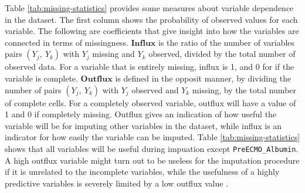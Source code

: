 \documentclass[12pt,]{article}
\begin{document}
Table \ref{tab:missing-statistics} provides some measures about variable
dependence in the dataset. The first column shows the probability of
observed values for each variable. The following are coefficients that
give insight into how the variables are connected in terms of
missingness. \(\mathbf{Influx}\) is the ratio of the number of variables
pairs \((Y_j, ~Y_k)\) with \(Y_j\) missing and \(Y_k\) observed, divided
by the total number of observed data. For a variable that is entirely
missing, influx is 1, and 0 for if the variable is complete.
\(\mathbf{Outflux}\) is defined in the opposit manner, by dividing the
number of pairs \((Y_j, ~Y_k)\) with \(Y_j\) observed and \(Y_k\)
missing, by the total number of complete cells. For a completely
observed variable, outflux will have a value of 1 and 0 if completely
missing. Outflux gives an indication of how useful the variable will be
for imputing other variables in the dataset, while influx is an
indicator for how easily the variable can be imputed. Table
\ref{tab:missing-statistics} shows that all variables will be useful
during impuation except \texttt{PreECMO\_Albumin}. A high outflux
variable might turn out to be useless for the imputation procedure if it
is unrelated to the incomplete variables, while the usefulness of a
highly predictive variables is severely limited by a low outflux value
\citeyearpar{van_buuren_flexible_2012}.
\end{document}
